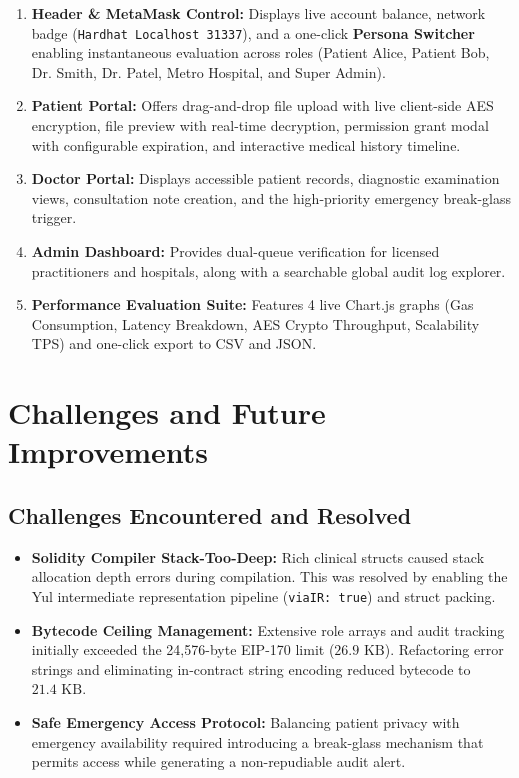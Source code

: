 \documentclass[11pt,a4paper]{article}
\begin{document}
\begin{enumerate}
    \item \textbf{Header \& MetaMask Control:} Displays live account balance, network badge (\texttt{Hardhat Localhost 31337}), and a one-click \textbf{Persona Switcher} enabling instantaneous evaluation across roles (Patient Alice, Patient Bob, Dr. Smith, Dr. Patel, Metro Hospital, and Super Admin).
    \item \textbf{Patient Portal:} Offers drag-and-drop file upload with live client-side AES encryption, file preview with real-time decryption, permission grant modal with configurable expiration, and interactive medical history timeline.
    \item \textbf{Doctor Portal:} Displays accessible patient records, diagnostic examination views, consultation note creation, and the high-priority emergency break-glass trigger.
    \item \textbf{Admin Dashboard:} Provides dual-queue verification for licensed practitioners and hospitals, along with a searchable global audit log explorer.
    \item \textbf{Performance Evaluation Suite:} Features 4 live Chart.js graphs (Gas Consumption, Latency Breakdown, AES Crypto Throughput, Scalability TPS) and one-click export to CSV and JSON.
\end{enumerate}

\section{Challenges and Future Improvements}

\subsection{Challenges Encountered and Resolved}
\begin{itemize}
    \item \textbf{Solidity Compiler Stack-Too-Deep:} Rich clinical structs caused stack allocation depth errors during compilation. This was resolved by enabling the Yul intermediate representation pipeline (\texttt{viaIR: true}) and struct packing.
    \item \textbf{Bytecode Ceiling Management:} Extensive role arrays and audit tracking initially exceeded the 24,576-byte EIP-170 limit ($26.9\text{ KB}$). Refactoring error strings and eliminating in-contract string encoding reduced bytecode to $21.4\text{ KB}$.
    \item \textbf{Safe Emergency Access Protocol:} Balancing patient privacy with emergency availability required introducing a break-glass mechanism that permits access while generating a non-repudiable audit alert.
\end{itemize}
\end{document}
